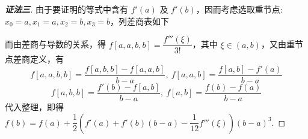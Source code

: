 \begin{proof}[{\songti \textbf{证法三}}]
    由于要证明的等式中含有 $f'(a)$ 及 $f'(b)$，因而考虑选取重节点: $x_{0}=a,x_{1}=a,x_{2}=b,x_{3}=b$，列差商表如下
    \begin{table}[H]
        \centering
        \caption{}
    \end{table}
    而由差商与导数的关系，得 $f[a,a,b,b]=\dfrac{f'''(\xi)}{3!}$，其中 $\xi\in(a,b)$，又由重节点差商定义，有
    \begin{equation*}
        f[a,a,b,b]=\dfrac{f[a,b,b]-f[a,a,b]}{b-a},~f[a,a,b]=\dfrac{f[a,b]-f'(a)}{b-a}
    \end{equation*}
    \begin{equation*}
        f[a,b,b]=\dfrac{f'(b)-f[a,b]}{b-a},~f[a,b]=\dfrac{f(b)-f(a)}{b-a}
    \end{equation*}
    代入整理，即得 $f(b)=f(a)+\dfrac{1}{2}(f'(a)+f'(b)(b-a)-\dfrac{1}{12}f'''(\xi))(b-a)^{3}.$
\end{proof}

